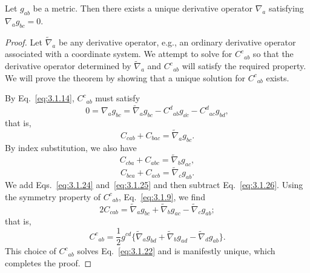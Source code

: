 \begin{theorem}\label{thm:3.1.1}
Let $g_{ab}$ be a metric. Then there exists a unique derivative operator
$\nabla_a$ satisfying $\nabla_ag_{bc}=0$.
\end{theorem}
\begin{proof}
Let $\widetilde\nabla_a$ be any derivative operator, e.g., an ordinary derivative operator
associated with a coordinate system. We attempt to solve for $C^c{}_{ab}$ so that the
derivative operator determined by $\widetilde\nabla_a$ and $C^c{}_{ab}$ will satisfy the required property. We
will prove the theorem by showing that a unique solution for $C^c{}_{ab}$ exists.

By Eq.~\eqref{eq:3.1.14}, $C^c{}_{ab}$ must satisfy
\begin{equation}
  0=\nabla_ag_{bc}=\widetilde\nabla_ag_{bc}-C^d{}_{ab}g_{\dd c}-C^d{}_{ac}g_{bd},
  \tag{3.1.23}\label{eq:3.1.23}
\end{equation}
that is,
\begin{equation}
  C_{cab}+C_{bac}=\widetilde\nabla_ag_{bc}.
  \tag{3.1.24}\label{eq:3.1.24}
\end{equation}
By index substitution, we also have
\begin{equation}
  C_{cba}+C_{abc}=\widetilde\nabla_bg_{ac},
  \tag{3.1.25}\label{eq:3.1.25}
\end{equation}
\begin{equation}
  C_{bca}+C_{acb}=\widetilde\nabla_cg_{ab}.
  \tag{3.1.26}\label{eq:3.1.26}
\end{equation}
We add Eqs.~\eqref{eq:3.1.24} and~\eqref{eq:3.1.25} and then subtract Eq.~\eqref{eq:3.1.26}. Using
the symmetry property of $C^c{}_{ab}$, Eq.~\eqref{eq:3.1.9}, we find
\begin{equation}
  2C_{cab}=\widetilde\nabla_ag_{bc}+\widetilde\nabla_bg_{ac}-\widetilde\nabla_cg_{ab};
  \tag{3.1.27}\label{eq:3.1.27}
\end{equation}
that is,
\begin{equation}
  C^c{}_{ab}=\frac{1}{2}g^{cd}
  \bigl\{\widetilde\nabla_ag_{bd}+\widetilde\nabla_bg_{ad}-\widetilde\nabla_dg_{ab}\bigr\}.
  \tag{3.1.28}\label{eq:3.1.28}
\end{equation}
This choice of $C^c{}_{ab}$ solves Eq.~\eqref{eq:3.1.22} and is manifestly unique, which completes the proof.
\end{proof}

